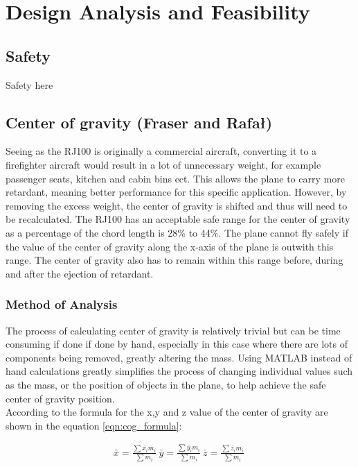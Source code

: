 \chapter{Design Analysis and Feasibility}
\section{Safety}
Safety here



\section{Center of gravity (Fraser and Rafał)}

Seeing as the RJ100 is originally a commercial aircraft, converting it to a firefighter aircraft would result in a lot of unnecessary weight, 
for example passenger seats, kitchen and cabin bins ect.
This allows the plane to carry more retardant, meaning better performance for this specific application.
However, by removing the excess weight, the center of gravity is shifted and thus will need to be recalculated.
The RJ100 has an acceptable safe range for the center of gravity as a percentage of the chord length is 28\% to 44\%.
The plane cannot fly safely if the value of the center of gravity along the x-axis of the plane is outwith this range.
The center of gravity also has to remain within this range before, during and after the ejection of retardant.

\subsection{Method of Analysis}
The process of calculating center of gravity is relatively trivial but can be time consuming if done if done by hand,
especially in this case where there are lots of components being removed, greatly altering the mass.
Using MATLAB instead of hand calculations greatly simplifies the process of changing individual values such as the mass, or the position of objects in the plane, to help achieve the safe center of gravity position. \\ 

According to \cite{baker2020engineering} the formula for the x,y and z value of the center of gravity are shown in the equation \ref{eqn:cog_formula}:

\begin{equation}
\begin{split}
  \bar{x} = \frac{\sum{ \bar{x_{i}} m_{i} }}{ \sum{ m_{i}}} \
  \bar{y} = \frac{\sum{ \bar{y_{i}} m_{i} }}{ \sum{ m_{i}}} \
  \bar{z} = \frac{\sum{ \bar{z_{i}} m_{i} }}{ \sum{ m_{i}}} \
\end{split}
\label{eqn:cog_formula}
\end{equation}

